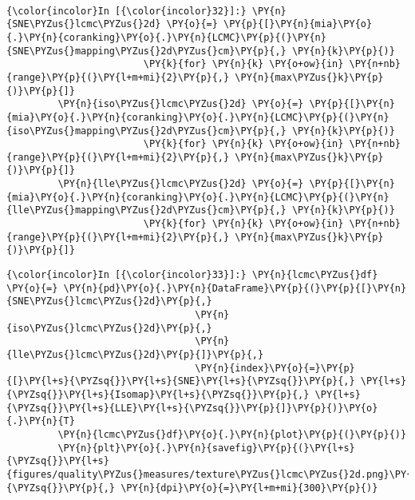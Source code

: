     \begin{center}
    \end{center}
    { \hspace*{\fill} \\}

    \begin{Verbatim}[commandchars=\\\{\}]
{\color{incolor}In [{\color{incolor}32}]:} \PY{n}{SNE\PYZus{}lcmc\PYZus{}2d} \PY{o}{=} \PY{p}{[}\PY{n}{mia}\PY{o}{.}\PY{n}{coranking}\PY{o}{.}\PY{n}{LCMC}\PY{p}{(}\PY{n}{SNE\PYZus{}mapping\PYZus{}2d\PYZus{}cm}\PY{p}{,} \PY{n}{k}\PY{p}{)}
                        \PY{k}{for} \PY{n}{k} \PY{o+ow}{in} \PY{n+nb}{range}\PY{p}{(}\PY{l+m+mi}{2}\PY{p}{,} \PY{n}{max\PYZus{}k}\PY{p}{)}\PY{p}{]}
         \PY{n}{iso\PYZus{}lcmc\PYZus{}2d} \PY{o}{=} \PY{p}{[}\PY{n}{mia}\PY{o}{.}\PY{n}{coranking}\PY{o}{.}\PY{n}{LCMC}\PY{p}{(}\PY{n}{iso\PYZus{}mapping\PYZus{}2d\PYZus{}cm}\PY{p}{,} \PY{n}{k}\PY{p}{)}
                        \PY{k}{for} \PY{n}{k} \PY{o+ow}{in} \PY{n+nb}{range}\PY{p}{(}\PY{l+m+mi}{2}\PY{p}{,} \PY{n}{max\PYZus{}k}\PY{p}{)}\PY{p}{]}
         \PY{n}{lle\PYZus{}lcmc\PYZus{}2d} \PY{o}{=} \PY{p}{[}\PY{n}{mia}\PY{o}{.}\PY{n}{coranking}\PY{o}{.}\PY{n}{LCMC}\PY{p}{(}\PY{n}{lle\PYZus{}mapping\PYZus{}2d\PYZus{}cm}\PY{p}{,} \PY{n}{k}\PY{p}{)}
                        \PY{k}{for} \PY{n}{k} \PY{o+ow}{in} \PY{n+nb}{range}\PY{p}{(}\PY{l+m+mi}{2}\PY{p}{,} \PY{n}{max\PYZus{}k}\PY{p}{)}\PY{p}{]}
\end{Verbatim}

    \begin{Verbatim}[commandchars=\\\{\}]
{\color{incolor}In [{\color{incolor}33}]:} \PY{n}{lcmc\PYZus{}df} \PY{o}{=} \PY{n}{pd}\PY{o}{.}\PY{n}{DataFrame}\PY{p}{(}\PY{p}{[}\PY{n}{SNE\PYZus{}lcmc\PYZus{}2d}\PY{p}{,}
                                 \PY{n}{iso\PYZus{}lcmc\PYZus{}2d}\PY{p}{,}
                                 \PY{n}{lle\PYZus{}lcmc\PYZus{}2d}\PY{p}{]}\PY{p}{,}
                                 \PY{n}{index}\PY{o}{=}\PY{p}{[}\PY{l+s}{\PYZsq{}}\PY{l+s}{SNE}\PY{l+s}{\PYZsq{}}\PY{p}{,} \PY{l+s}{\PYZsq{}}\PY{l+s}{Isomap}\PY{l+s}{\PYZsq{}}\PY{p}{,} \PY{l+s}{\PYZsq{}}\PY{l+s}{LLE}\PY{l+s}{\PYZsq{}}\PY{p}{]}\PY{p}{)}\PY{o}{.}\PY{n}{T}
         \PY{n}{lcmc\PYZus{}df}\PY{o}{.}\PY{n}{plot}\PY{p}{(}\PY{p}{)}
         \PY{n}{plt}\PY{o}{.}\PY{n}{savefig}\PY{p}{(}\PY{l+s}{\PYZsq{}}\PY{l+s}{figures/quality\PYZus{}measures/texture\PYZus{}lcmc\PYZus{}2d.png}\PY{l+s}{\PYZsq{}}\PY{p}{,} \PY{n}{dpi}\PY{o}{=}\PY{l+m+mi}{300}\PY{p}{)}
\end{Verbatim}

